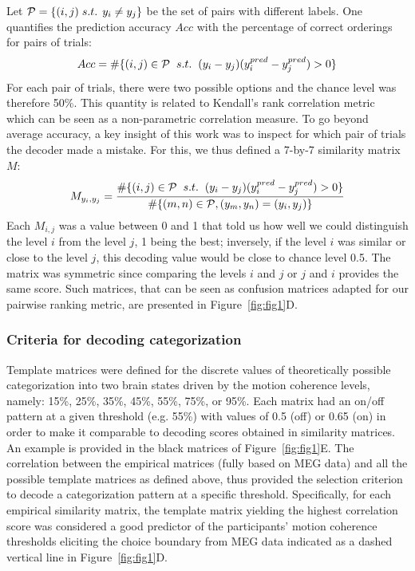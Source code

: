 Let $\mathcal{P}=\{(i,j) \hspace{1mm} s.t. \hspace{1.5mm} y_i \neq y_j\}$ be the set of pairs with different labels. One quantifies the prediction accuracy $Acc$ with the percentage of correct orderings for pairs of trials:
\begin{equation}
	Acc = \#\{(i,j) \in\mathcal{P} \hspace{2mm} s.t. \hspace{2mm} (y_i - y_j)(y_i^{pred} - y_j^{pred}) > 0 \}
\end{equation}
For each pair of trials, there were two possible options and the chance level was therefore 50\%. This quantity is related to Kendall’s rank correlation metric~\cite{46kruskal1958ordinal} which can be seen as a non-parametric correlation measure. To go beyond average accuracy, a key insight of this work was to inspect for which pair of trials the decoder made a mistake. For this, we thus defined a 7-by-7 similarity matrix $M$:
\begin{equation}
	M_{y_i,y_j} = \frac{\#\{(i,j)\in\mathcal{P} \hspace{2mm} s.t. \hspace{2mm} (y_i-y_j)(y_i^{pred}-y_j^{pred}) > 0\}}{\#\{(m,n)\in\mathcal{P}, (y_m, y_n) = (y_i, y_j)\}}
\end{equation}
Each $M_{i,j}$ was a value between 0 and 1 that told us how well we could distinguish the level $i$ from the level $j$, 1 being the best; inversely, if the level $i$ was similar or close to the level $j$, this decoding value would be close to chance level 0.5. The matrix was symmetric since comparing the levels $i$ and $j$ or $j$ and $i$  provides the same score. Such matrices, that can be seen as confusion matrices adapted for our pairwise ranking metric, are presented in Figure~\ref{fig:fig1}D.

\subsubsection*{Criteria for decoding categorization}
Template matrices were defined for the discrete values of theoretically possible categorization into two brain states driven by the motion coherence levels, namely: 15\%, 25\%, 35\%, 45\%, 55\%, 75\%, or 95\%. Each matrix had an on/off pattern at a given threshold (e.g. 55\%) with values of 0.5 (off) or 0.65 (on) in order to make it comparable to decoding scores obtained in similarity matrices. An example is provided in the black matrices of Figure~\ref{fig:fig1}E. The correlation between the empirical matrices (fully based on MEG data) and all the possible template matrices as defined above, thus provided the selection criterion to decode a categorization pattern at a specific threshold. Specifically, for each empirical similarity matrix, the template matrix yielding the highest correlation score was considered a good predictor of the participants' motion coherence thresholds eliciting the choice boundary from MEG data indicated as a dashed vertical line in Figure~\ref{fig:fig1}D.

